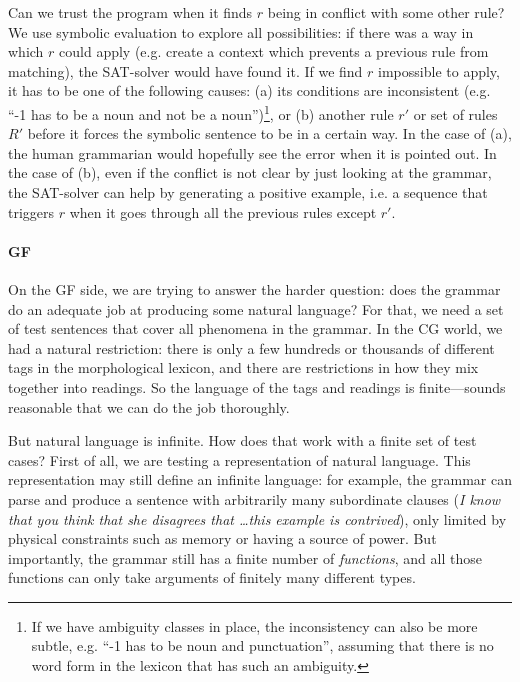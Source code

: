 Can we trust the program when it finds $r$ being in conflict with some
other rule? We use symbolic evaluation to explore all possibilities:
if there was a way in which $r$ could apply (e.g. create a context
which prevents a previous rule from matching), the SAT-solver would
have found it. If we find $r$ impossible to apply, it has to be one of
the following causes: (a) its conditions are inconsistent (e.g. ``-1
has to be a noun and not be a noun'')\footnote{If we have ambiguity
  classes in place, the inconsistency can also be more subtle,
  e.g. ``-1 has to be noun and punctuation'', assuming that there is
  no word form in the lexicon that has such an ambiguity.}, or (b)
another rule $r'$ or set of rules $R'$ before it forces the symbolic
sentence to be in a certain way. In the case of (a), the human
grammarian would hopefully see the error when it is pointed out. In
the case of (b), even if the conflict is not clear by just looking at
the grammar, the SAT-solver can help by generating a positive example,
i.e. a sequence that triggers $r$ when it goes through all the
previous rules except $r'$.


\paragraph{GF} On the GF side, we are trying to answer the
harder question: does the grammar do an adequate job at producing
some natural language? For that, we need a set of test sentences that
cover all phenomena in the grammar. In the CG world, we had a natural
restriction: there is only a few hundreds or thousands of different
tags in the morphological lexicon, and there are restrictions in how
they mix together into readings. So the language of the tags and
readings is finite---sounds reasonable that we can do the job
thoroughly.

But natural language is infinite. How does that work with a finite set
of test cases? First of all, we are testing a \pmcfg{} representation
of natural language. This representation may still define an infinite
language: for example, the grammar can parse and produce a sentence
with arbitrarily many subordinate clauses (\emph{I know that you think
  that she disagrees that \dots this example is contrived}), only
limited by physical constraints such as memory or having a source of
power. But importantly, the grammar still has a
finite number of \emph{functions}, and all those functions can only
take arguments of finitely many different types.


